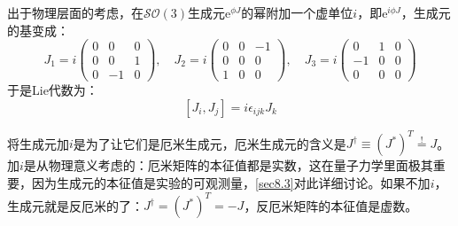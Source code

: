 出于物理层面的考虑，在$\mathcal{SO}(3)$生成元$\mathrm{e}^{\phi J}$的幂附加一个虚单位$i$，即$\mathrm{e}^{i\phi J}$，生成元的基变成：
\begin{equation}
\label{equ3.72}
J_1 = i
	\begin{pmatrix}
		0 & 0 & 0 \\
		0 & 0 & 1 \\
		0 & -1 & 0
	\end{pmatrix}
,\quad
J_2 = i
	\begin{pmatrix}
		0 & 0 & -1 \\
		0 & 0 & 0 \\
		1 & 0 & 0
	\end{pmatrix}
,\quad
J_3 = i
	\begin{pmatrix}
		0 & 1 & 0 \\
		-1 & 0 & 0 \\
		0 & 0 & 0
	\end{pmatrix}
\end{equation}
于是Lie代数为：
\begin{equation}
\label{equ3.73}
[J_i, J_j] = i\epsilon_{ijk} J_k
\end{equation}

将生成元加$i$是为了让它们是厄米生成元，厄米生成元的含义是$J^\dag \equiv (J^*)^T \stackrel{!}{=} J$。加$i$是从物理意义考虑的：厄米矩阵的本征值都是实数，这在量子力学里面极其重要，因为生成元的本征值是实验的可观测量，\ref{sec8.3}对此详细讨论。如果不加$i$，生成元就是反厄米的了：$J^\dag = (J^*)^T = -J$，反厄米矩阵的本征值是虚数。

